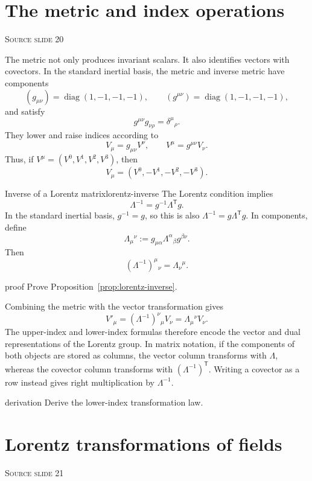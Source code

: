 \documentclass[11pt,a4paper]{article}
\newcommand{\transpose}{\mathsf{T}}
\newcommand{\slideref}[1]{%
  \par\smallskip
  {\footnotesize\color{ink!60}\textsc{Source slide #1}}\par
}
\begin{document}
\section{The metric and index operations}
\slideref{20}

The metric not only produces invariant scalars. It also identifies vectors with
covectors. In the standard inertial basis, the metric and inverse metric have
components
\[
  (g_{\mu\nu})=\operatorname{diag}(1,-1,-1,-1),
  \qquad
  (g^{\mu\nu})=\operatorname{diag}(1,-1,-1,-1),
\]
and satisfy
\[
  g^{\mu\nu}g_{\nu\rho}=\delta^\mu{}_\rho.
\]
They lower and raise indices according to
\[
  V_\mu=g_{\mu\nu}V^\nu,
  \qquad
  V^\mu=g^{\mu\nu}V_\nu.
\]
Thus, if \(V^\mu=(V^0,V^1,V^2,V^3)\), then
\[
  V_\mu=(V^0,-V^1,-V^2,-V^3).
\]

\begin{proposition}{Inverse of a Lorentz matrix}{lorentz-inverse}
The Lorentz condition implies
\[
\boxed{
  \Lambda^{-1}=g^{-1}\Lambda^{\transpose}g.
}
\]
In the standard inertial basis, \(g^{-1}=g\), so this is also
\(\Lambda^{-1}=g\Lambda^{\transpose}g\). In components, define
\[
  \Lambda_\mu{}^\nu
  :=g_{\mu\alpha}\Lambda^\alpha{}_\beta g^{\beta\nu}.
\]
Then
\[
  (\Lambda^{-1})^\mu{}_\nu=\Lambda_\nu{}^\mu.
\]
\end{proposition}

\begin{studentwork}[height=7.8cm]{proof}
Prove Proposition~\ref{prop:lorentz-inverse}.
\end{studentwork}

Combining the metric with the vector transformation gives
\[
  V'_\mu
  =(\Lambda^{-1})^\nu{}_\mu V_\nu
  =\Lambda_\mu{}^\nu V_\nu.
\]
The upper-index and lower-index formulas therefore encode the vector and dual
representations of the Lorentz group.
In matrix notation, if the components of both objects are stored as columns,
the vector column transforms with \(\Lambda\), whereas the covector column
transforms with \((\Lambda^{-1})^{\transpose}\). Writing a covector as a row
instead gives right multiplication by \(\Lambda^{-1}\).

\begin{studentwork}[height=5.8cm]{derivation}
Derive the lower-index transformation law.
\end{studentwork}

\section{Lorentz transformations of fields}
\slideref{21}
\end{document}
